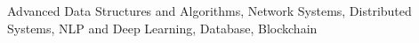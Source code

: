 Advanced Data Structures and Algorithms, Network
Systems, Distributed Systems, NLP and Deep Learning, Database, Blockchain
